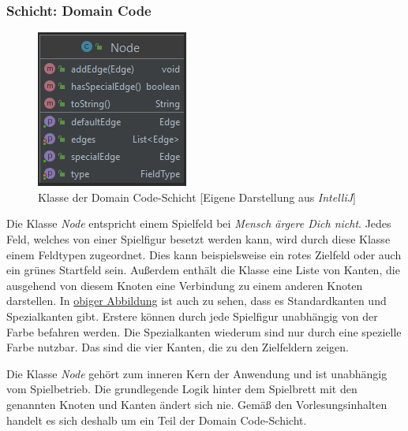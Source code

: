 \subsubsection{Schicht: Domain Code}
\begin{figure}[htbp]
\centering
\centerline{\includegraphics[scale=.6]{node}}
\caption{Klasse der Domain Code-Schicht [Eigene Darstellung aus \emph{IntelliJ}]}
\label{fig:klassedomaincodeschicht}
\end{figure}
\noindent Die Klasse \emph{Node} entspricht einem Spielfeld bei \emph{Mensch ärgere Dich nicht}. Jedes Feld, welches von einer Spielfigur besetzt werden kann, wird durch diese Klasse einem Feldtypen zugeordnet. Dies kann beispielsweise ein rotes Zielfeld oder auch ein grünes Startfeld sein. Außerdem enthält die Klasse eine Liste von Kanten, die ausgehend von diesem Knoten eine Verbindung zu einem anderen Knoten darstellen. In \hyperref[fig:klasseadomaincodeschicht]{obiger Abbildung} ist auch zu sehen, dass es Standardkanten und Spezialkanten gibt. Erstere können durch jede Spielfigur unabhängig von der Farbe befahren werden. Die Spezialkanten wiederum sind nur durch eine spezielle Farbe nutzbar. Das sind die vier Kanten, die zu den Zielfeldern zeigen.

Die Klasse \emph{Node} gehört zum inneren Kern der Anwendung und ist unabhängig vom Spielbetrieb. Die grundlegende Logik hinter dem Spielbrett mit den genannten Knoten und Kanten ändert sich nie. Gemäß den Vorlesungsinhalten handelt es sich deshalb um ein Teil der Domain Code-Schicht.
\newpage
